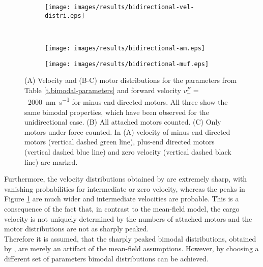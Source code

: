 \renewcommand{\thesubfigure}{\Alph{subfigure}}
\begin{figure}
\centering
\captionsetup[subfigure]{justification=justified,singlelinecheck=false,labelformat=simple}
\begin{subfigure}{0.40\textwidth}
 \subcaption{}
 \texttt{[image: images/results/bidirectional-vel-distri.eps]}
\end{subfigure}\\
\begin{subfigure}{0.35\textwidth}
 \subcaption{}
 \texttt{[image: images/results/bidirectional-am.eps]}
\end{subfigure}
\begin{subfigure}{0.35\textwidth}
 \subcaption{}
 \texttt{[image: images/results/bidirectional-muf.eps]}
\end{subfigure}
\caption[Bimodal velocity and motor distributions for bidirectional transport]{(A) Velocity and (B-C) motor distributions for the parameters from Table \ref{t.bimodal-parameters} and forward velocity \mbox{$v_-^F =$ \SI{2000}{\nano\metre\per\second}} for minus-end directed motors. All three show the same bimodal properties, which have been observed for the unidirectional case. (B) All attached motors counted. (C) Only motors under force counted. In (A) velocity of minus-end directed motors (vertical dashed green line), plus-end directed motors (vertical dashed blue line) and zero velocity (vertical dashed black line) are marked.} 
\label{img.bimodal-bidirectional-vel-and-motor-distri-for-standard-params}
\end{figure}
\renewcommand{\thesubfigure}{\alph{subfigure}}

Furthermore, the velocity distributions obtained by \cite{pnas105} are extremely sharp, with vanishing probabilities for intermediate or zero velocity, whereas the peaks in Figure
\ref{img.bimodal-bidirectional-vel-and-motor-distri-for-standard-params} are much wider and intermediate velocities are probable. This is a consequence of the fact that, in contrast to the
mean-field model, the cargo velocity is not uniquely determined by the numbers of attached motors and the motor distributions are not as sharply peaked. \\
Therefore it is assumed, that the sharply peaked bimodal distributions, obtained by \cite{pnas105}, are merely an artifact of the mean-field assumptions. However, by choosing a different set of
parameters bimodal distributions can be achieved.

